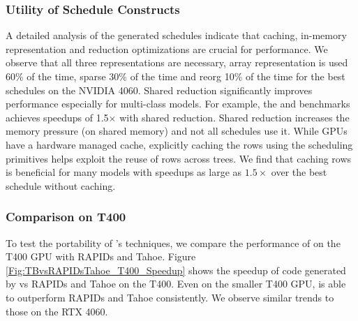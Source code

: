 \subsubsection*{Utility of Schedule Constructs}
A detailed analysis of the generated schedules indicate that caching, in-memory representation 
and reduction optimizations are crucial for performance. We observe that all three representations 
are necessary, array representation is used 60\% of the time, sparse 30\% of the time and reorg 
10\% of the time for the best schedules on the NVIDIA 4060.  
Shared reduction significantly improves performance especially for multi-class models. For example, 
the  and  benchmarks achieves speedups of 1.5$\times$ with shared reduction. 
Shared reduction increases the memory pressure (on shared memory) and not all schedules use it.
While GPUs have a hardware managed cache, explicitly caching the rows using the scheduling primitives 
helps exploit the reuse of rows across trees. We find that caching rows is beneficial for many models
with speedups as large as $1.5\times$ over the best schedule without caching.

\subsubsection*{Comparison on T400}
To test the portability of \Treebeard{}'s techniques, we compare the performance 
of \Treebeard{} on the T400 GPU with RAPIDs and Tahoe. Figure \ref{Fig:TBvsRAPIDsTahoe_T400_Speedup}
shows the speedup of code generated by \Treebeard{} vs RAPIDs and Tahoe on the T400.
Even on the smaller T400 GPU, \Treebeard{} is able to outperform RAPIDs
and Tahoe consistently. We observe similar trends to those on the RTX 4060.

